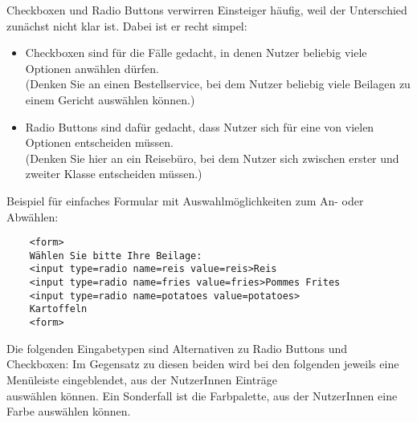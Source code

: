Checkboxen und Radio Buttons verwirren Einsteiger häufig, weil der Unterschied zunächst nicht klar ist. Dabei ist er recht simpel: \\

\begin{itemize}
	\item Checkboxen sind für die Fälle gedacht, in denen Nutzer beliebig viele Optionen anwählen dürfen.\\
	(Denken Sie an einen Bestellservice, bei dem Nutzer beliebig viele Beilagen zu einem Gericht auswählen können.)
	\item Radio Buttons sind dafür gedacht, dass Nutzer sich für eine von vielen Optionen entscheiden müssen.\\
	(Denken Sie hier an ein Reisebüro, bei dem Nutzer sich zwischen erster und zweiter Klasse entscheiden müssen.)
\end{itemize}

Beispiel für einfaches Formular mit Auswahlmöglichkeiten zum An- oder Abwählen:

\begin{verbatim}
	<form>
	Wählen Sie bitte Ihre Beilage:
	<input type=radio name=reis value=reis>Reis
	<input type=radio name=fries value=fries>Pommes Frites
	<input type=radio name=potatoes value=potatoes>
	Kartoffeln
	<form>
\end{verbatim}

Die folgenden Eingabetypen sind Alternativen zu Radio Buttons und \\Checkboxen: Im Gegensatz zu diesen beiden wird bei den folgenden jeweils eine Menüleiste eingeblendet, aus der NutzerInnen Einträge \\auswählen können. Ein Sonderfall ist die Farbpalette, aus der NutzerInnen eine Farbe auswählen können.

